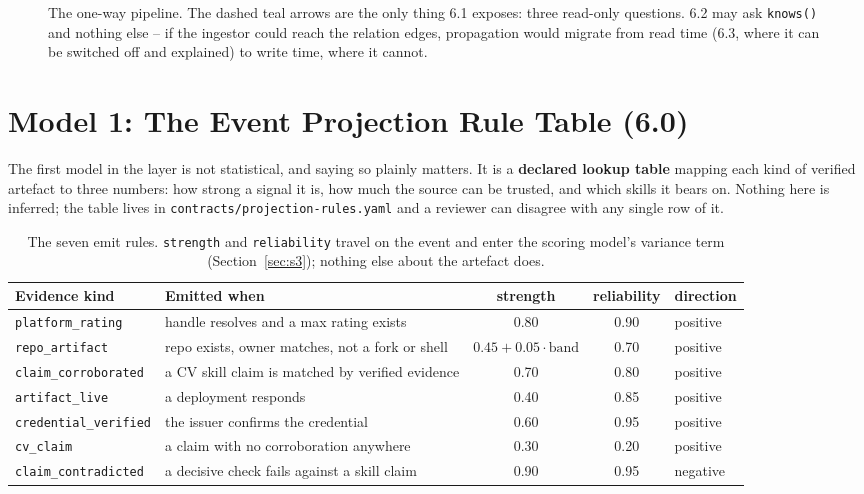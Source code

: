 \documentclass[11pt,a4paper]{article}
\begin{document}
\begin{figure}[H]
{%
}
\caption{The one-way pipeline. The dashed teal arrows are the only thing 6.1
exposes: three read-only questions. 6.2 may ask \texttt{knows()} and nothing
else -- if the ingestor could reach the relation edges, propagation would
migrate from read time (6.3, where it can be switched off and explained) to
write time, where it cannot.}
\label{fig:pipeline}
\end{figure}

\section{Model 1: The Event Projection Rule Table (6.0)}
\label{sec:projection}

The first model in the layer is not statistical, and saying so plainly
matters. It is a \textbf{declared lookup table} mapping each kind of
verified artefact to three numbers: how strong a signal it is, how much the
source can be trusted, and which skills it bears on. Nothing here is
inferred; the table lives in \texttt{contracts/projection-rules.yaml} and a
reviewer can disagree with any single row of it.

\begin{table}[H]
\centering\small
\begin{tabular}{@{}lL{5.1cm}ccl@{}}
\toprule
\textbf{Evidence kind} & \textbf{Emitted when} & \textbf{strength} & \textbf{reliability} & \textbf{direction} \\
\midrule
\texttt{platform\_rating}     & handle resolves and a max rating exists                    & 0.80 & 0.90 & positive \\
\texttt{repo\_artifact}       & repo exists, owner matches, not a fork or shell             & $0.45{+}0.05{\cdot}\text{band}$ & 0.70 & positive \\
\texttt{claim\_corroborated}  & a CV skill claim is matched by verified evidence            & 0.70 & 0.80 & positive \\
\texttt{artifact\_live}       & a deployment responds                                       & 0.40 & 0.85 & positive \\
\texttt{credential\_verified} & the issuer confirms the credential                          & 0.60 & 0.95 & positive \\
\texttt{cv\_claim}            & a claim with no corroboration anywhere                      & 0.30 & 0.20 & positive \\
\texttt{claim\_contradicted}  & a decisive check fails against a skill claim                & 0.90 & 0.95 & {\color{negative}negative} \\
\bottomrule
\end{tabular}
\caption{The seven emit rules. \texttt{strength} and \texttt{reliability}
travel on the event and enter the scoring model's variance term
(Section~\ref{sec:s3}); nothing else about the artefact does.}
\end{table}
\end{document}

